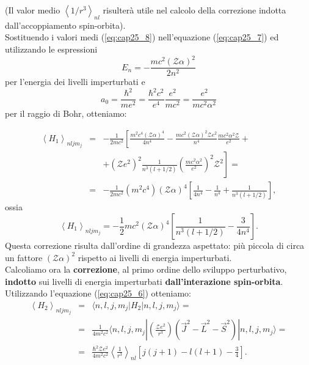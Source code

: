 (Il valor medio $\left<1/r^3\right>_{nl}$ risulterà utile nel calcolo della correzione indotta dall'accoppiamento spin-orbita). \\
Sostituendo i valori medi (\ref{eq:cap25_8}) nell'equazione (\ref{eq:cap25_7}) ed utilizzando le espressioni
\begin{equation} 
E_n=-\frac{mc^2 \left(\mathcal{Z}\alpha\right)^2}{2n^2} 
\end{equation}
per l'energia dei livelli imperturbati e 
\begin{equation} 
a_0=\frac{\hbar^2}{me^2}=\frac{\hbar^2c^2}{e^4}\frac{e^2}{mc^2}=\frac{e^2}{mc^2\alpha^2}
\end{equation}
per il raggio di Bohr, otteniamo:

\begin{eqnarray} 
 \left< H_1 \right>_{nljm_j} & =& -\frac{1}{2mc^2} \left[ \frac{m^2c^4 \left( \mathcal{Z} \alpha \right)^4}{4n^4}-\frac{mc^2 \left( \mathcal{Z} \alpha \right)^2 \mathcal{Z} e^2}{n^4} \frac{mc^2\alpha^2 \mathcal{Z}}{e^2}+ \right. \nonumber \\
& &\left. + \left( \mathcal{Z} e^2 \right)^2 \frac{1}{n^3(l+1/2)} \left(\frac{mc^2\alpha^2}{e^2} \right)^2 \mathcal{Z}^2 \right] = \nonumber  \\
& = & -\frac{1}{2mc^2} \left( m^2c^4 \right) \left( \mathcal{Z} \alpha\right)^4 \left[ \frac{1}{4n^4}-\frac{1}{n^4}+\frac{1}{n^3(l+1/2)}  \right] ,
\end{eqnarray}
ossia
\begin{equation} \label{eq:cap25_9}
\left< H_1 \right>_{nljm_j} = -\frac{1}{2}mc^2 \left( \mathcal{Z} \alpha \right)^4 \left[ \frac{1}{n^3(l+1/2)}-\frac{3}{4n^4}\right]  .
\end{equation}
Questa correzione risulta dall'ordine di grandezza aspettato: più piccola di circa un fattore $\left( \mathcal{Z} \alpha \right)^2$ rispetto ai livelli di energia imperturbati. \\
Calcoliamo ora la \textbf{correzione}, al primo ordine dello sviluppo perturbativo, \textbf{indotto} sui livelli di energia imperturbati \textbf{dall'interazione spin-orbita}. \\ 
Utilizzando l'equazione (\ref{eq:cap25_6}) otteniamo:
\begin{eqnarray} \label{eq:cap25_10}
\left< H_2 \right>_{nljm_j} &=& \langle n,l,j,m_j | H_2 | n,l,j,m_j \rangle = \nonumber  \\
& = &\frac{1}{4m^2c^2} \langle n,l,j,m_j | \left( \frac{\mathcal{Z}e^2}{r^3} \right) \left( \vec{J}^2-\vec{L}^2-\vec{S}^2 \right)      | n,l,j,m_j \rangle= \nonumber  \\
& = & \frac{\hbar^2\mathcal{Z}e^2}{4m^2c^2} \left< \frac{1}{r^3} \right>_{nl} \left[ j(j+1)-l(l+1)-\frac{3}{4}  \right] .
\end{eqnarray}
